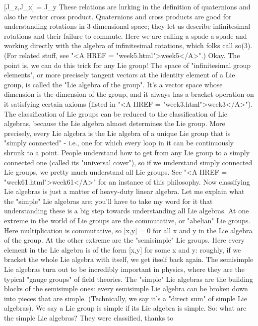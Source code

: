   [J_z,J_x] = J_y
These relations are lurking in the definition of quaternions
and also the vector cross product.  Quaternions and cross products are good for
understanding rotations in 3-dimensional space; they let us
describe infinitesimal
rotations and their failure to commute.  Here we are calling a spade a
spade and working directly with the algebra of infinitesimal
rotations, which folks call so(3).  (For related stuff, see "<A
HREF = "week5.html">week5</A>".)
Okay.  The point is, we can do this trick for any Lie group!  The
space of "infinitesimal group elements", or more precisely tangent
vectors at the identity element of a Lie group, is called the "Lie
algebra of the group".  It's a vector space whose dimension is the
dimension of the group, and it always has a bracket operation on it
satisfying certain axioms (listed in "<A HREF = "week3.html">week3</A>").
The classification of Lie groups can be reduced to the classification
of Lie algebras, because the Lie algebra almost determines the Lie
group.  More precisely, every Lie algebra is the Lie algebra of a
unique Lie group that is "simply connected" - i.e., one for which 
every loop in it can be continuously shrunk to a point.  People 
understand how to get from any Lie group to a simply connected one 
(called its "universal cover"), so if we understand simply connected 
Lie groups, we pretty much understand all Lie groups.   See "<A HREF
= "week61.html">week61</A>" 
for an instance of this philosophy.
Now classifying Lie algebras is just a matter of heavy-duty linear
algebra.  Let me explain what the "simple" Lie algebras are; you'll
have to take my word for it that understanding these is a big step
towards understanding all Lie algebras.
At one extreme in the world of Lie groups are the commutative, or
"abelian" Lie groups.  Here multiplication is commutative, so [x,y] =
0 for all x and y in the Lie algebra of the group.  At the other
extreme are the "semisimple" Lie groups.  Here every element in the
Lie algebra is of the form [x,y] for some x and y: roughly, if we
bracket the whole Lie algebra with itself, we get itself back again.
The semisimple Lie algebras turn out to be incredibly important in
physics, where they are the typical "gauge groups" of field theories.
The "simple" Lie algebras are the building blocks of the semisimple ones:
every semisimple Lie algebra can be broken down into pieces that are
simple.  (Technically, we say it's a "direct sum" of simple Lie algebras).
We say a Lie group is simple if its Lie algebra is simple.    
So: what are the simple Lie algebras?  They were classified, thanks to
